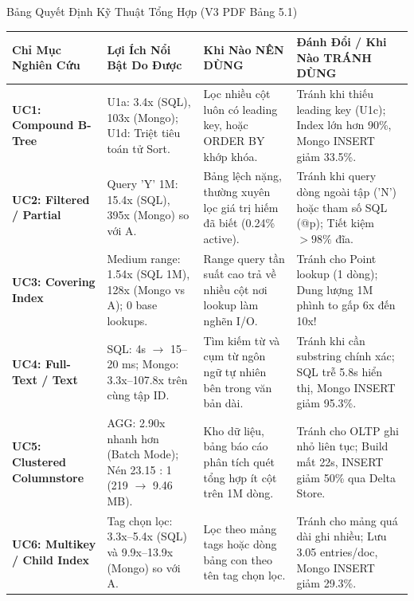 \documentclass[aspectratio=169,9pt]{beamer}
\begin{document}
\begin{frame}{Bảng Quyết Định Kỹ Thuật Tổng Hợp (V3 PDF Bảng 5.1)}
\tiny
\begin{table}
\centering
\begin{tabularx}{\linewidth}{@{}l X X X@{}}
\toprule
\textbf{Chỉ Mục Nghiên Cứu} & \textbf{Lợi Ích Nổi Bật Do Được} & \textbf{Khi Nào NÊN DÙNG} & \textbf{Đánh Đổi / Khi Nào TRÁNH DÙNG} \\
\midrule
\textbf{UC1: Compound B-Tree} & U1a: 3.4x (SQL), 103x (Mongo); U1d: Triệt tiêu toán tử Sort. & Lọc nhiều cột luôn có leading key, hoặc ORDER BY khớp khóa. & Tránh khi thiếu leading key (U1c); Index lớn hơn 90\%, Mongo INSERT giảm 33.5\%. \\
\addlinespace
\textbf{UC2: Filtered / Partial} & Query 'Y' 1M: 15.4x (SQL), 395x (Mongo) so với A. & Bảng lệch nặng, thường xuyên lọc giá trị hiếm đã biết (0.24\% active). & Tránh khi query dòng ngoài tập ('N') hoặc tham số SQL (@p); Tiết kiệm $>98\%$ đĩa. \\
\addlinespace
\textbf{UC3: Covering Index} & Medium range: 1.54x (SQL 1M), 128x (Mongo vs A); 0 base lookups. & Range query tần suất cao trả về nhiều cột nơi lookup làm nghẽn I/O. & Tránh cho Point lookup (1 dòng); Dung lượng 1M phình to gấp 6x đến 10x! \\
\addlinespace
\textbf{UC4: Full-Text / Text} & SQL: 4s $\to$ 15--20 ms; Mongo: 3.3x--107.8x trên cùng tập ID. & Tìm kiếm từ và cụm từ ngôn ngữ tự nhiên bên trong văn bản dài. & Tránh khi cần substring chính xác; SQL trễ 5.8s hiển thị, Mongo INSERT giảm 95.3\%. \\
\addlinespace
\textbf{UC5: Clustered Columnstore} & AGG: 2.90x nhanh hơn (Batch Mode); Nén 23.15 : 1 (219 $\to$ 9.46 MB). & Kho dữ liệu, bảng báo cáo phân tích quét tổng hợp ít cột trên 1M dòng. & Tránh cho OLTP ghi nhỏ liên tục; Build mất 22s, INSERT giảm 50\% qua Delta Store. \\
\addlinespace
\textbf{UC6: Multikey / Child Index} & Tag chọn lọc: 3.3x--5.4x (SQL) và 9.9x--13.9x (Mongo) so với A. & Lọc theo mảng tags hoặc dòng bảng con theo tên tag chọn lọc. & Tránh cho mảng quá dài ghi nhiều; Lưu 3.05 entries/doc, Mongo INSERT giảm 29.3\%. \\
\bottomrule
\end{tabularx}
\end{table}
\end{frame}
\end{document}
